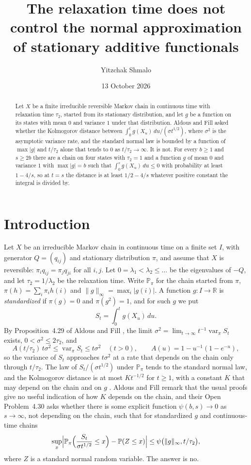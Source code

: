 \documentclass[11pt]{amsart}
\title[Relaxation time and normal approximation]{The relaxation time does not control the normal approximation of stationary additive functionals}
\author{Yitzchak Shmalo}
\date{13 October 2026}
\theoremstyle{remark}
\numberwithin{equation}{section}
\newcommand{\Pp}{\mathbb P}
\DeclareMathOperator{\var}{var}
\begin{document}
\begin{abstract}
Let $X$ be a finite irreducible reversible Markov chain in continuous time with relaxation time $\tau_2$, started from its stationary distribution, and let $g$ be a function on its states with mean $0$ and variance $1$ under that distribution. Aldous and Fill asked whether the Kolmogorov distance between $\int_0^tg(X_u)\,du/(\sigma t^{1/2})$, where $\sigma^2$ is the asymptotic variance rate, and the standard normal law is bounded by a function of $\max|g|$ and $t/\tau_2$ alone that tends to $0$ as $t/\tau_2\to\infty$. It is not. For every $b\ge1$ and $s\ge2b$ there are a chain on four states with $\tau_2=1$ and a function $g$ of mean $0$ and variance $1$ with $\max|g|=b$ such that $\int_0^sg(X_u)\,du\le0$ with probability at least $1-4/s$, so at $t=s$ the distance is at least $1/2-4/s$ whatever positive constant the integral is divided by.
\end{abstract}
\maketitle

\section{Introduction}

Let $X$ be an irreducible Markov chain in continuous time on a finite set $I$, with generator $Q=(q_{ij})$ and stationary distribution $\pi$, and assume that $X$ is reversible: $\pi_iq_{ij}=\pi_jq_{ji}$ for all $i,j$. Let $0=\lambda_1<\lambda_2\le\dots$ be the eigenvalues of $-Q$, and let $\tau_2=1/\lambda_2$ be the relaxation time. Write $\Pp_\pi$ for the chain started from $\pi$, $\pi(h)=\sum_i\pi_ih(i)$ and $\|g\|_\infty=\max_i|g(i)|$. A function $g\colon I\to\mathbb R$ is \emph{standardized} if $\pi(g)=0$ and $\pi(g^2)=1$, and for such $g$ we put
\[
S_t=\int_0^tg(X_u)\,du .
\]
By Proposition~4.29 of Aldous and Fill \cite{AF}, the limit $\sigma^2=\lim_{t\to\infty}t^{-1}\var_\pi S_t$ exists, $0<\sigma^2\le2\tau_2$, and
\[
A(t/\tau_2)\,t\sigma^2\le\var_\pi S_t\le t\sigma^2\quad(t>0),\qquad A(u)=1-u^{-1}(1-e^{-u}),
\]
so the variance of $S_t$ approaches $t\sigma^2$ at a rate that depends on the chain only through $t/\tau_2$. The law of $S_t/(\sigma t^{1/2})$ under $\Pp_\pi$ tends to the standard normal law, and the Kolmogorov distance is at most $Kt^{-1/2}$ for $t\ge1$, with a constant $K$ that may depend on the chain and on $g$ \cite[Proposition~4.51]{AF}. Aldous and Fill remark that the usual proofs give no useful indication of how $K$ depends on the chain, and their Open Problem~4.30 asks whether there is some explicit function $\psi(b,s)\to0$ as $s\to\infty$, not depending on the chain, such that for standardized $g$ and continuous-time chains
\begin{equation}\label{eq:op}
\sup_x\Bigl|\Pp_\pi\Bigl(\frac{S_t}{\sigma t^{1/2}}\le x\Bigr)-\Pp(Z\le x)\Bigr|\le\psi\bigl(\|g\|_\infty,t/\tau_2\bigr),
\end{equation}
where $Z$ is a standard normal random variable. The answer is no.
\end{document}
